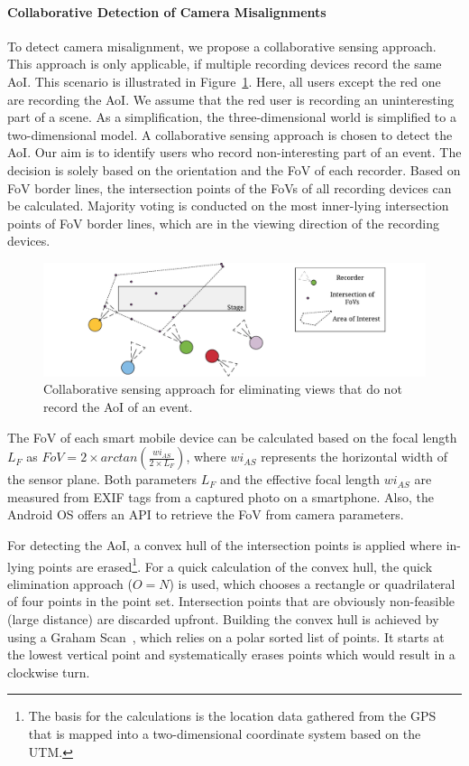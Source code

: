 \paragraph{Collaborative Detection of Camera Misalignments}
\label{sec:554_misalignments}
To detect camera misalignment, we propose a collaborative sensing approach.
This approach is only applicable, if multiple recording devices record the same \ac{AoI}.
This scenario is illustrated in Figure~\ref{fig:554_fov}.
Here, all users except the red one are recording the \ac{AoI}.
We assume that the red user is recording an uninteresting part of a scene. As a simplification, the three-dimensional world is simplified to a two-dimensional model. 
A collaborative sensing approach is chosen to detect the \ac{AoI}. 
Our aim is to identify users who record non-interesting part of an event. 
The decision is solely based on the orientation and the \ac{FoV} of each recorder. 
Based on \ac{FoV} border lines, the intersection points of the \ac{FoV}s of all recording devices can be calculated. 
Majority voting is conducted on the most inner-lying intersection points of \ac{FoV} border lines, which are in the viewing direction of the recording devices.
\begin{figure}
	\centering
	\includegraphics[width=\linewidth]{./gfx/550_QA/misalignment}
	\caption[Collaborative sensing for AoI detection.]{Collaborative sensing approach for eliminating views that do not record the \ac{AoI} of an event.}
	\label{fig:554_fov}
\end{figure}
The \ac{FoV} of each smart mobile device can be calculated based on the focal length $L_{F}$ as $FoV = 2 \times arctan(\frac{wi_{AS}}{2 \times  L_{F}})$, where $wi_{AS}$ represents the horizontal width of the sensor plane. 
Both parameters $L_{F}$ and the effective focal length $wi_{AS}$ are measured from EXIF tags from a captured photo on a smartphone. 
Also, the Android \ac{OS} offers an \ac{API} to retrieve the \ac{FoV} from camera parameters. 

For detecting the \ac{AoI}, a convex hull of the intersection points is applied where in-lying points are erased\footnote{
The basis for the calculations is the location data gathered from the \ac{GPS} that is mapped into a two-dimensional coordinate system based on the \ac{UTM}.}. 
For a quick calculation of the convex hull, the quick elimination approach ($O=N$) is used, which chooses a rectangle or quadrilateral of four points in the point set. 
Intersection points that are obviously non-feasible (large distance) %
are discarded upfront.
Building the convex hull is achieved by using a Graham Scan~\cite{Graham1972}, which relies on a polar sorted list of  points. 
It starts at the lowest vertical point and systematically erases points which would result in a clockwise turn.

